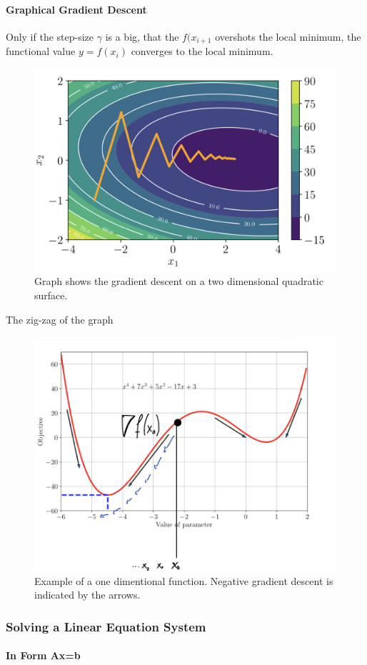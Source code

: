 \paragraph{Graphical Gradient Descent}
Only if the step-size $\gamma$ is a big, that the $f(x_{i+1}$ overshots the local minimum, the functional value $y=f(x_{i})$ converges to the local minimum.

\begin{figure}[H]
	\centering
	\includegraphics[scale = 0.2]{attachment/chapter_10/Scc053}
	\caption{Graph shows the gradient descent on a two dimensional quadratic surface.}
\end{figure}


The zig-zag of the graph

\begin{figure}[H]
	\centering
	\includegraphics[scale = 0.2]{attachment/chapter_10/Scc052}
	\caption{Example of a one dimentional function. Negative gradient descent is indicated by the arrows.}
\end{figure}

\subsubsection{Solving a Linear Equation System}
\paragraph{In Form Ax=b}

